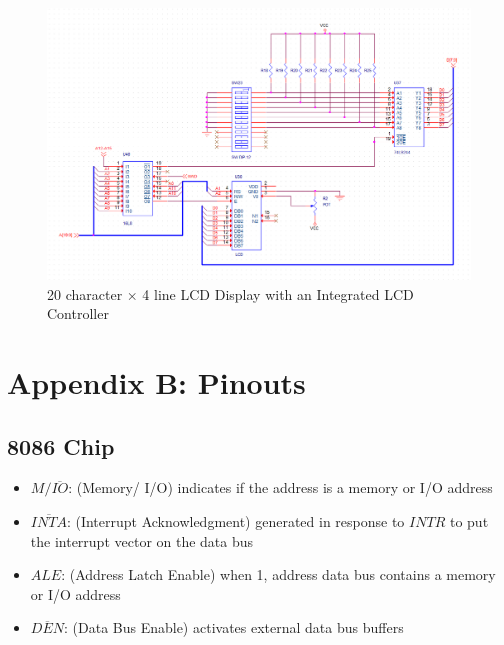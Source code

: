         \begin{figure}[ht]
            \begin{center}
                \includegraphics[width=1\textwidth]{figures/schematics/page11.png}
                \caption{20 character $\times$ 4 line LCD Display with an Integrated LCD Controller} \label{fig:page11}
            \end{center}
        \end{figure}



    \clearpage
    \newpage

    \section{Appendix B: Pinouts} \label{appendix:pinouts}

        \subsection{8086 Chip}

                \begin{itemize}

                    \item $M/\overline{IO}$: (Memory/ I/O) indicates if the address is a memory or I/O address

                    \item $\overline{INTA}$: (Interrupt Acknowledgment) generated in response to $INTR$ to put the interrupt vector on the data bus

                    \item $ALE$: (Address Latch Enable) when 1, address data bus contains a memory or I/O address

                    \item $\overline{DEN}$: (Data Bus Enable) activates external data bus buffers

                \end{itemize}

